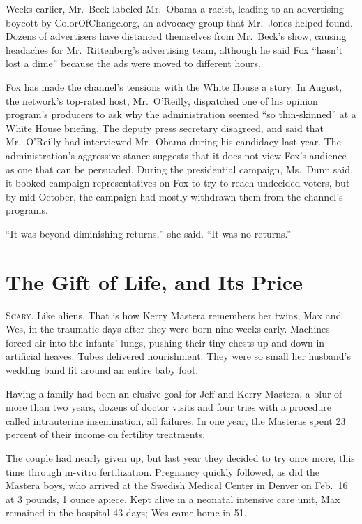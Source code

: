 ﻿\documentclass[12pt]{article}
\begin{document}
Weeks earlier, Mr.~Beck labeled Mr.~Obama a racist, leading to an advertising boycott by
ColorOfChange.org, an advocacy group that Mr.~Jones helped found. Dozens of advertisers have
distanced themselves from Mr.~Beck's show, causing headaches for Mr.~Rittenberg's advertising team,
although he said Fox ``hasn't lost a dime'' because the ads were moved to different hours.

Fox has made the channel's tensions with the White House a story. In August, the network's top-rated
host, Mr.~O'Reilly, dispatched one of his opinion program's producers to ask why the administration
seemed ``so thin-skinned'' at a White House briefing. The deputy press secretary disagreed, and said
that Mr.~O'Reilly had interviewed Mr.~Obama during his candidacy last year. The administration's
aggressive stance suggests that it does not view Fox's audience as one that can be persuaded. During
the presidential campaign, Ms.~Dunn said, it booked campaign representatives on Fox to try to reach
undecided voters, but by mid-October, the campaign had mostly withdrawn them from the channel's
programs.

``It was beyond diminishing returns,'' she said. ``It was no returns.''

\section{The Gift of Life, and Its Price}

\lettrine{S}{cary}. Like aliens. That is how Kerry Mastera remembers her
twins, Max and Wes, in the traumatic days after they were born nine weeks early. Machines forced air
into the infants' lungs, pushing their tiny chests up and down in artificial heaves. Tubes delivered
nourishment. They were so small her husband's wedding band fit around an entire baby foot.

Having a family had been an elusive goal for Jeff and Kerry Mastera, a blur of more than two years,
dozens of doctor visits and four tries with a procedure called intrauterine insemination, all
failures. In one year, the Masteras spent 23 percent of their income on fertility treatments.

The couple had nearly given up, but last year they decided to try once more, this time through
in-vitro fertilization. Pregnancy quickly followed, as did the Mastera boys, who arrived at the
Swedish Medical Center in Denver on Feb.~16 at 3 pounds, 1 ounce apiece. Kept alive in a neonatal
intensive care unit, Max remained in the hospital 43 days; Wes came home in 51.
\end{document}
